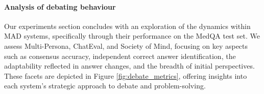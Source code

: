\documentclass{article}  %
\begin{document}
\paragraph{Analysis of debating behaviour} \label{app:additional-metrics}
Our experiments section concludes with an exploration of the dynamics within MAD systems, specifically through their performance on the MedQA test set. We assess Multi-Persona, ChatEval, and Society of Mind, focusing on key aspects such as consensus accuracy, independent correct answer identification, the adaptability reflected in answer changes, and the breadth of initial perspectives. These facets are depicted in Figure \ref{fig:debate_metrics}, offering insights into each system's strategic approach to debate and problem-solving.

\end{document}
